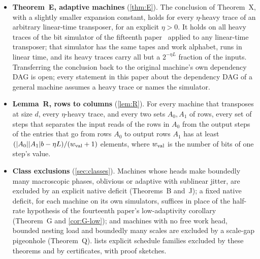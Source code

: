 \begin{itemize}[leftmargin=1.5em]
small fixed $\eta$, has on that trace one unrestricted work head while every other work head keeps its revisits within a small fixed
fraction of~$L$, whatever the input head does. Every such transposer, in particular every oblivious one, therefore has at least two work
heads that each return to cells linearly often after moving a fixed fraction of $L$ away; and for each work head, some set containing a fixed fraction of its
outputs reaches long revisits off that head with linear expansion.
\item \textbf{Theorem~E, adaptive machines} (\cref{thm:E}). The conclusion of Theorem~X, with a slightly smaller expansion constant, holds
for every $\eta$-heavy trace of an arbitrary linear-time transposer, for an explicit $\eta>0$. It holds on all heavy traces of the bit simulator of the fifteenth
paper~\cite[Theorem~S]{HighRate2026} applied to any linear-time transposer; that simulator has the same tapes and work alphabet, runs in
linear time, and its heavy traces carry all but a $2^{-\eta L}$ fraction of the inputs. Transferring the conclusion back to the original
machine's own dependency DAG is open; every statement in this paper about the dependency DAG of a general machine assumes a heavy trace or
names the simulator.
\item \textbf{Lemma~R, rows to columns} (\cref{lem:R}). For every machine that transposes at size $d$, every $\eta$-heavy trace, and every two
sets $A_0,A_1$ of rows, every set of steps that separates the input reads of the rows in $A_0$ from the output steps of the entries that go
from rows $A_0$ to output rows $A_1$ has at least $(\lvert A_0 \rvert\lvert A_1 \rvert b-\eta L)/(w_{\mathrm{val}}+1)$ elements, where $w_{\mathrm{val}}$ is the number of bits of
one step's value.
\item \textbf{Class exclusions} (\cref{sec:classes}). Machines whose heads make boundedly many macroscopic phases, oblivious or adaptive with
sublinear jitter, are excluded by an explicit native deficit (Theorems~B and~J); a fixed native deficit, for each machine on its own
simulators, suffices in place of the half-rate hypothesis of the fourteenth paper's low-adaptivity corollary (Theorem~G and
\cref{cor:G-low}); and machines with no free work head, bounded nesting load and
boundedly many scales are excluded by a scale-gap pigeonhole (Theorem~Q).  lists explicit schedule families excluded
by these theorems and by certificates, with proof sketches.
\end{itemize}

